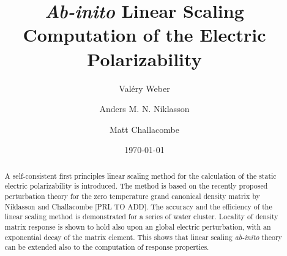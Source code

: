 \documentclass[twocolumn,showpacs,preprintnumbers,amsmath,amssymb]{revtex4}
\begin{document}

\title{\emph{Ab-inito} Linear Scaling Computation of the Electric Polarizability}%

\author{Val\'ery Weber}
\author{Anders M. N. Niklasson}%
\author{Matt Challacombe}%

%

\date{\today}%

\begin{abstract}
 A self-consistent first principles linear scaling method for the
 calculation of the static electric polarizability is introduced.
 The method is based on the recently proposed
 perturbation theory for the zero temperature grand canonical density matrix
 by Niklasson and Challacombe [PRL TO ADD].
 The accuracy and the efficiency of the linear scaling
 method is demonstrated for a series of water cluster.
 Locality of density matrix  response is shown to hold also upon an global
 electric perturbation, with an exponential decay of the matrix element.
 This shows that linear scaling \emph{ab-inito}
 theory can be extended also to the computation of response properties.

\end{abstract}

\maketitle
\end{document}
